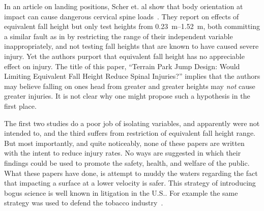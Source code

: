 \documentclass[smallextended]{svjour3}       %
\begin{document}

In an article on landing positions, Scher et. al show that body orientation at
impact can cause dangerous cervical spine loads~\cite{Scher2015}. They report
on effects of equivalent fall height but only test heights from
\SIrange{0.23}{1.52}{\meter}, both committing a similar fault as in by
\cite{Shealy2010} restricting the range of their independent variable
inappropriately, and not testing fall heights that are known to have caused
severe injury. Yet the authors purport that equivalent fall height has no
appreciable effect on injury. The title of this paper, ``Terrain Park Jump
Design: Would Limiting Equivalent Fall Height Reduce Spinal Injuries?'' implies
that the authors may believe falling on ones head from greater and greater
heights may \emph{not} cause greater injuries. It is not clear why one might
propose such a hypothesis in the first place.

The first two studies do a poor job of isolating variables, and apparently were
not intended to, and the third suffers from restriction of equivalent fall
height range. But most importantly, and quite noticeably, none of these papers
are written with the intent to reduce injury rates. No ways are suggested in
which their findings could be used to promote the safety, health, and welfare
of the public. What these papers have done, is attempt to muddy the waters
regarding the fact that impacting a surface at a lower velocity is safer. This
strategy of introducing bogus science is well known in litigation in the U.S..
For example the same strategy was used to defend the tobacco
industry~\cite{Oreskes2010}.
\end{document}
